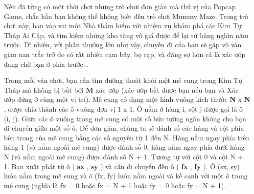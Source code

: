 

Nếu đã từng có một thời chơi những trò chơi đơn giản mà thú vị của Popcap Game, chắc hẳn bạn không thể không biết đến trò chơi Mummy Maze. Trong trò chơi này, bạn vào vai một Nhà thám hiểm với nhiệm vụ khám phá các Kim Tự Tháp Ai Cập, và tìm kiếm những kho tàng vô giá được để lại từ hàng nghìn năm trước. Dĩ nhiên, với phần thưởng lớn như vậy, chuyến đi của bạn sẽ gặp vô vàn gian nan trắc trở do có rất nhiều cạm bẫy, bọ cạp, và đáng sợ hơn cả là xác ướp đang chờ bạn ở phía trước...

Trong mỗi ván chơi, bạn cần tìm đường thoát khỏi một mê cung trong Kim Tự Tháp mà không bị bắt bởi \textbf{ M } xác ướp (xác ướp bắt được bạn nếu bạn và Xác ướp đứng ở cùng một vị trí). Mê cung có dạng một hình vuông kích thước \textbf{ N } x \textbf{ N } , được chia thành các ô vuông đơn vị 1 x 1. Ô nằm ở hàng i, cột j được gọi là ô (i, j). Giữa các ô vuông trong mê cung có một số bức tường ngăn không cho bạn di chuyển giữa một số ô. Để đơn giản, chúng ta sẽ đánh số các hàng và cột phía bên trong của mê cung bằng các số nguyên từ 1 đến N. Hàng nằm ngay phía trên hàng 1 (và nằm ngoài mê cung) được đánh số 0, hàng nằm ngay phía dưới hàng N (và nằm ngoài mê cung) được đánh số N + 1. Tương tự với cột 0 và cột N + 1. Bạn xuất phát từ ô ( \textbf{ sx } , \textbf{ sy } ) và cần di chuyển đến ô ( \textbf{ fx } , \textbf{ fy } ). Ô (sx, sy) luôn nằm trong mê cung và ô (fx, fy) luôn nằm ngoài và kề cạnh với một ô trong mê cung (nghĩa là fx = 0 hoặc fx = N + 1 hoặc fy = 0 hoặc fy = N + 1).

